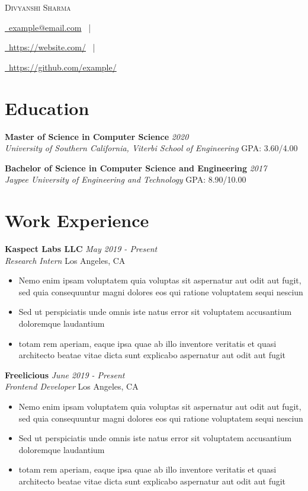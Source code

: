 \documentclass[letterpaper,10pt]{article}
\makeatletter
\newcommand{\organization}[4]{
    \vspace{1.5pt}
    \textbf{#1} \hfill{\emph{#2}} \\
    \emph{#3} \hfill{#4} \\
    \vspace{3pt}
}
\newcommand{\bulletsBegin}{
    \vspace{1pt}
    \begin{minipage}{17.6cm} 
    \begin{itemize}[leftmargin=0.6cm]
    \setlength\itemsep{-0.009em}
}
\newcommand{\bulletsEnd}{
    \end{itemize}\vspace{0pt}
    \end{minipage}
}
\newcommand{\mySite}[1]{
    \href{https://example.com}{\faLink \ #1}
    \ |
}
\newcommand{\myEmail}[1]{
    \href{mailto:example@email.edu}{\faEnvelope \ #1}
    \ |
}
\newcommand{\myGitHub}[1]{
    \href{https://github.com/example/}{\faGithub \ #1}
}
\newcommand{\myName}[4]{
    \begin{center}
        {\huge{\color{burgundy}\scshape{#1}}} \\
        \vspace{6pt}
        \myEmail{#4}
        \mySite{#2}
        \myGitHub{#3}
    \end{center}
    \vspace{-4pt}
}
\makeatother
\begin{document}
    \myName{Divyanshi Sharma}{https://website.com/}{https://github.com/example/}{example@email.com}

    \section{Education}
        
    \organization{Master of Science in Computer Science}{2020}
        {University of Southern California, Viterbi School of Engineering}{GPA: 3.60/4.00}
        \vspace{-2pt}

	\organization{Bachelor of Science in Computer Science and Engineering}{2017}
        {Jaypee University of Engineering and Technology}{GPA: 8.90/10.00}
        \vspace{-2pt}

    \section{Work Experience}

        \organization{Kaspect Labs LLC}{May 2019 - Present}
        {Research Intern}{Los Angeles, CA}
        \bulletsBegin
            \item Nemo enim ipsam voluptatem quia voluptas sit aspernatur aut odit aut fugit, sed quia consequuntur magni dolores eos qui ratione voluptatem sequi nesciun
            \item Sed ut perspiciatis unde omnis iste natus error sit voluptatem accusantium doloremque laudantium
            \item totam rem aperiam, eaque ipsa quae ab illo inventore veritatis et quasi architecto beatae vitae dicta sunt explicabo aspernatur aut odit aut fugit
        \bulletsEnd

        \organization{Freelicious}{June 2019 - Present}
        {Frontend Developer}{Los Angeles, CA}
        \bulletsBegin
            \item Nemo enim ipsam voluptatem quia voluptas sit aspernatur aut odit aut fugit, sed quia consequuntur magni dolores eos qui ratione voluptatem sequi nesciun
            \item Sed ut perspiciatis unde omnis iste natus error sit voluptatem accusantium doloremque laudantium
            \item totam rem aperiam, eaque ipsa quae ab illo inventore veritatis et quasi architecto beatae vitae dicta sunt explicabo aspernatur aut odit aut fugit
        \bulletsEnd
\end{document}
